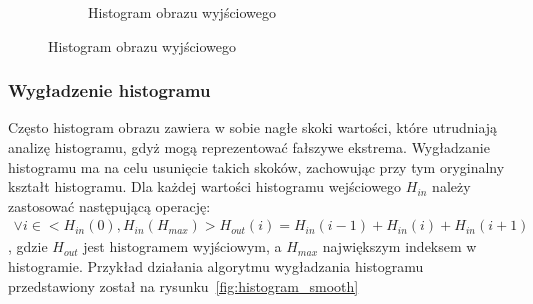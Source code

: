\begin{figure}
\begin{subfigure}[b]{0.45\textwidth}
    \caption{Histogram obrazu wyjściowego}
    \label{fig:equalize_histogram_histogram_after}
  \end{subfigure}
\end{figure}

\subsubsection{Wygładzenie histogramu}
Często histogram obrazu zawiera w sobie nagłe skoki wartości, które utrudniają analizę histogramu, gdyż mogą reprezentować fałszywe ekstrema. Wygładzanie histogramu ma na celu usunięcie takich skoków, zachowując przy tym oryginalny kształt histogramu. Dla każdej wartości histogramu wejściowego \textit{$H_{in}$} należy zastosować następującą operację:
\begin{gather*}
  \vee i \in <H_{in}(0), H_{in}(H_{max})> H_{out}(i) = H_{in}(i-1) + H_{in}(i) + H_{in}(i+1)
\end{gather*},
gdzie \textit{$H_{out}$} jest histogramem wyjściowym, a $H_{max}$ największym indeksem w histogramie. Przykład działania algorytmu wygładzania histogramu przedstawiony został na rysunku~\ref{fig:histogram_smooth}
